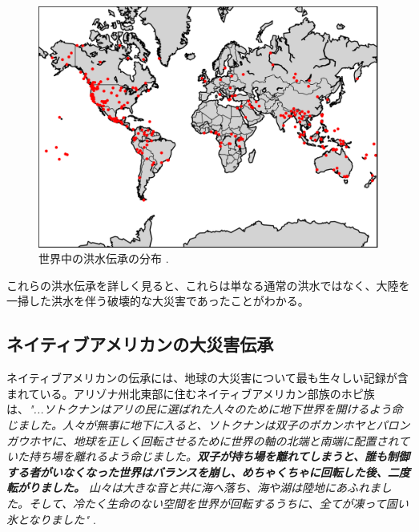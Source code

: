 \documentclass[10pt,twocolumn,letterpaper]{article}
\begin{document}
\begin{figure}[h]
\begin{center}
   \includegraphics[width=1\linewidth]{b.png}
\end{center}
   \caption{世界中の洪水伝承の分布 \cite{3}.}
\label{fig:1}
\label{fig:onecol}
\end{figure}

これらの洪水伝承を詳しく見ると、これらは単なる通常の洪水ではなく、大陸を一掃した洪水を伴う破壊的な大災害であったことがわかる。

\subsection{ネイティブアメリカンの大災害伝承}

ネイティブアメリカンの伝承には、地球の大災害について最も生々しい記録が含まれている。アリゾナ州北東部に住むネイティブアメリカン部族のホピ族は、\textit{"...ソトクナンはアリの民に選ばれた人々のために地下世界を開けるよう命じました。人々が無事に地下に入ると、ソトクナンは双子のポカンホヤとパロンガウホヤに、地球を正しく回転させるために世界の軸の北端と南端に配置されていた持ち場を離れるよう命じました。\textbf{双子が持ち場を離れてしまうと、誰も制御する者がいなくなった世界はバランスを崩し、めちゃくちゃに回転した後、二度転がりました。} 山々は大きな音と共に海へ落ち、海や湖は陸地にあふれました。そして、冷たく生命のない空間を世界が回転するうちに、全てが凍って固い氷となりました"} \cite{4}.
\end{document}
